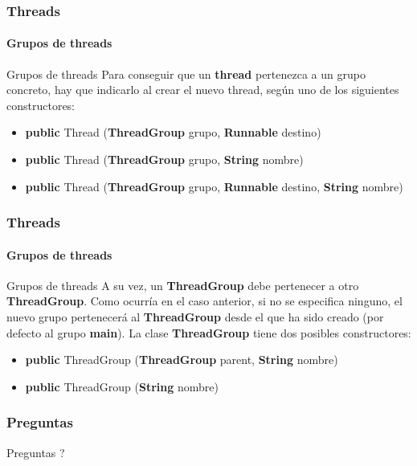\documentclass{beamer}
\begin{document}
    \begin{frame}
		\frametitle{Threads}
		\framesubtitle{Grupos de threads}

        \begin{block}{Grupos de threads} 
            Para conseguir que un \textbf{thread} pertenezca a un grupo concreto, hay que indicarlo al crear el nuevo thread, seg\'un uno de los siguientes constructores:
            \begin{itemize}
                \item[] \textbf{public} Thread (\textbf{ThreadGroup} grupo, \textbf{Runnable} destino)
                \item[] \textbf{public} Thread (\textbf{ThreadGroup} grupo, \textbf{String} nombre)
                \item[] \textbf{public} Thread (\textbf{ThreadGroup} grupo, \textbf{Runnable} destino, \textbf{String} nombre)
            \end{itemize}
        \end{block}
	\end{frame}

    \begin{frame}
		\frametitle{Threads}
		\framesubtitle{Grupos de threads}

        \begin{block}{Grupos de threads} 
            A su vez, un \textbf{ThreadGroup} debe pertenecer a otro \textbf{ThreadGroup}. Como ocurr\'ia en el caso anterior, si no se especifica ninguno, el nuevo grupo pertenecer\'a al \textbf{ThreadGroup} desde el que ha sido creado (por defecto al grupo \textbf{main}). La clase \textbf{ThreadGroup} tiene dos posibles constructores: 
            \begin{itemize}
                \item[] \textbf{public} ThreadGroup (\textbf{ThreadGroup} parent, \textbf{String} nombre)
                \item[] \textbf{public} ThreadGroup (\textbf{String} nombre)
            \end{itemize}
        \end{block}
	\end{frame}

    \begin{frame}
		\frametitle{Preguntas}

		\hspace{4cm}\huge{Preguntas ?}
		
	\end{frame}
	
\end{document}
